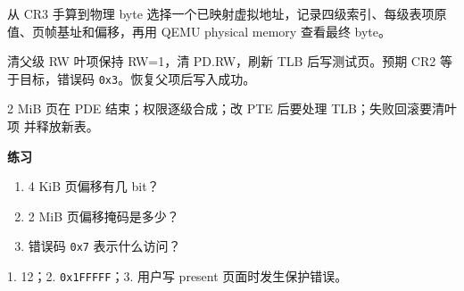 
\begin{experimentbox}{从 CR3 手算到物理 byte}
选择一个已映射虚拟地址，记录四级索引、每级表项原值、页帧基址和偏移，再用
QEMU physical memory 查看最终 byte。
\end{experimentbox}

\begin{faultinjectionbox}{清父级 RW}
叶项保持 RW=1，清 PD.RW，刷新 TLB 后写测试页。预期 CR2 等于目标，错误码
\texttt{0x3}。恢复父项后写入成功。
\end{faultinjectionbox}

\begin{pitfallbox}
2 MiB 页在 PDE 结束；权限逐级合成；改 PTE 后要处理 TLB；失败回滚要清叶项
并释放新表。
\end{pitfallbox}

\textbf{练习}
\begin{enumerate}[leftmargin=2.2em]
  \item 4 KiB 页偏移有几 bit？
  \item 2 MiB 页偏移掩码是多少？
  \item 错误码 \texttt{0x7} 表示什么访问？
\end{enumerate}
\begin{answerbox}
1. 12；2. \texttt{0x1FFFFF}；3. 用户写 present 页面时发生保护错误。
\end{answerbox}

